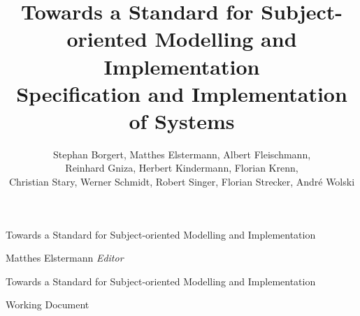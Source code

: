 \documentclass[11pt, showtrims, final, oldfontcommands]{memoir}
\title{Towards a Standard for Subject-oriented Modelling and Implementation\\ Specification and Implementation of Systems}
\author{Stephan Borgert, Matthes Elstermann, Albert Fleischmann, \\ Reinhard Gniza, Herbert Kindermann, Florian Krenn,\\ Christian Stary, Werner Schmidt, Robert Singer, Florian Strecker, Andr\'e Wolski}
\begin{document}
\frontmatter

\pagestyle{empty}

\vspace*{3cm}
\begin{adjustwidth}{0cm}{-3cm}
	\begin{flushright}
		\LARGE\textsf {Towards a Standard for Subject-oriented Modelling and Implementation}
	\end{flushright}
\end{adjustwidth}
\vspace*{\fill}
\cleardoublepage

\vspace*{0cm}
\begin{flushleft}
	\Large\textsf{Matthes Elstermann \textit{Editor}}\par
\end{flushleft}
\vspace{2cm}
\begin{flushleft}
	\Huge\textsf{Towards a Standard for Subject-oriented Modelling and Implementation}\par
	\bigskip\bigskip
	\Large\textsf{Working Document}
\end{flushleft}
\vspace{2.5cm}
\begin{flushleft}
\end{flushleft}
\vspace*{\fill}
\clearpage
\end{document}
